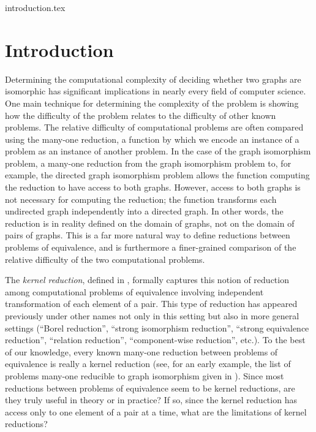 \begin{filecontents}{introduction.tex}
\section{Introduction}

Determining the computational complexity of deciding whether two graphs are isomorphic has significant implications in nearly every field of computer science.
One main technique for determining the complexity of the problem is showing how the difficulty of the problem relates to the difficulty of other known problems.
The relative difficulty of computational problems are often compared using the many-one reduction, a function by which we encode an instance of a problem as an instance of another problem.
In the case of the graph isomorphism problem, a many-one reduction from the graph isomorphism problem to, for example, the directed graph isomorphism problem allows the function computing the reduction to have access to both graphs.
However, access to both graphs is not necessary for computing the reduction; the function transforms each undirected graph independently into a directed graph.
In other words, the reduction is in reality defined on the domain of graphs, not on the domain of pairs of graphs.
This is a far more natural way to define reductions between problems of equivalence, and is furthermore a finer-grained comparison of the relative difficulty of the two computational problems.

The \emph{kernel reduction}, defined in \cite[Definition~4.13]{fg11}, formally captures this notion of reduction among computational problems of equivalence involving independent transformation of each element of a pair.
This type of reduction has appeared previously under other names not only in this setting but also in more general settings (``Borel reduction'', ``strong isomorphism reduction'', ``strong equivalence reduction'', ``relation reduction'', ``component-wise reduction'', etc.).
To the best of our knowledge, every known many-one reduction between problems of equivalence is really a kernel reduction (see, for an early example, the list of problems many-one reducible to graph isomorphism given in \cite{bc79}).
Since most reductions between problems of equivalence seem to be kernel reductions, are they truly useful in theory or in practice?
If so, since the kernel reduction has access only to one element of a pair at a time, what are the limitations of kernel reductions?


\end{filecontents}
